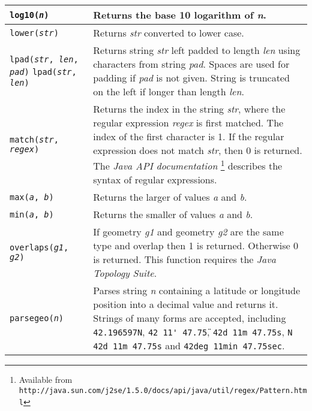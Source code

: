 \begin{longtable}{|p{5cm}|p{7cm}|}
\hline

\texttt{log10(\textit{n})} &
Returns the base 10 logarithm of \textit{n}. \\

\hline

\texttt{lower(\textit{str})} &
Returns \textit{str} converted to lower case. \\

\hline

\texttt{lpad(\textit{str}, \textit{len}, \textit{pad})}
\texttt{lpad(\textit{str}, \textit{len})} &
Returns string \textit{str} left padded to length \textit{len}
using characters from string \textit{pad}.
Spaces are used for padding if \textit{pad} is not given.
String is truncated on the left if longer than length \textit{len}. \\

\hline

\texttt{match(\textit{str}, \textit{regex})} &
Returns the index in the string \textit{str}, where the regular expression
\textit{regex} is first matched.  The index of the first character is 1.
If the regular expression does not match \textit{str}, then 0 is returned.
The \textit{Java API documentation}
\footnote{Available from \texttt{http://java.sun.com/j2se/1.5.0/docs/api/java/util/regex/Pattern.html}}
describes the syntax of regular expressions. \\

\hline

\texttt{max(\textit{a}, \textit{b})} &
Returns the larger of values \textit{a} and \textit{b}. \\

\hline

\texttt{min(\textit{a}, \textit{b})} &
Returns the smaller of values \textit{a} and \textit{b}. \\

\hline

\texttt{overlaps(\textit{g1}, \textit{g2})} &
If geometry \textit{g1} and geometry \textit{g2}
are the same type
and overlap
then 1 is returned.  Otherwise 0 is returned.
This function requires the \textit{Java Topology Suite}. \\

\hline

\texttt{parsegeo(\textit{n})} &
Parses string \textit{n} containing a latitude or longitude position
into a decimal value and returns it.  Strings of many forms are
accepted, including
\texttt{42.196597N}, \texttt{42\textdegree{} 11\'{} 47.75\"},
\texttt{42d 11m 47.75s},
\texttt{N 42d 11m 47.75s} and
\texttt{42deg 11min 47.75sec}. \\


\end{longtable}
